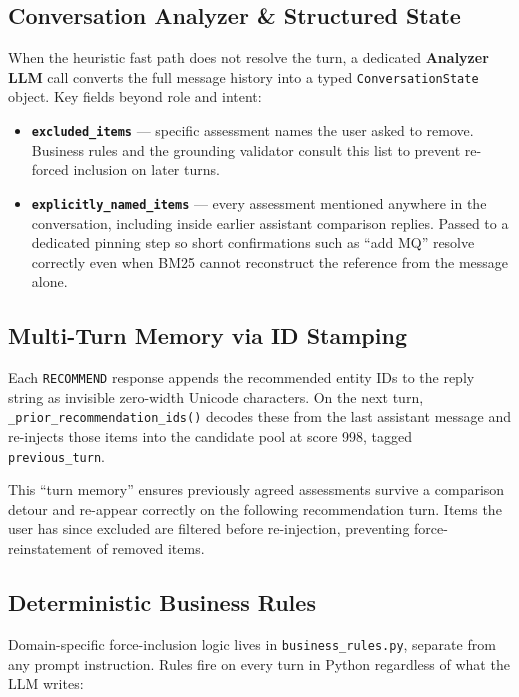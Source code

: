 \documentclass[10pt,twocolumn,letterpaper]{article}
\begin{document}
\subsection{Conversation Analyzer \& Structured State}

When the heuristic fast path does not resolve the turn, a dedicated
\textbf{Analyzer LLM} call converts the full message history into a
typed \texttt{ConversationState} object. Key fields beyond role and
intent:

\begin{itemize}

\item \textbf{\texttt{excluded\_items}} --- specific assessment names the
user asked to remove. Business rules and the grounding validator
consult this list to prevent re-forced inclusion on later turns.

\item \textbf{\texttt{explicitly\_named\_items}} --- every assessment
mentioned anywhere in the conversation, including inside earlier
assistant comparison replies. Passed to a dedicated pinning step so
short confirmations such as ``add MQ'' resolve correctly even when BM25
cannot reconstruct the reference from the message alone.

\end{itemize}

\subsection{Multi-Turn Memory via ID Stamping}

Each \texttt{RECOMMEND} response appends the recommended entity IDs to
the reply string as invisible zero-width Unicode characters. On the
next turn, \texttt{\_prior\_recommendation\_ids()} decodes these from
the last assistant message and re-injects those items into the
candidate pool at score 998, tagged \texttt{previous\_turn}.

This ``turn memory'' ensures previously agreed assessments survive a
comparison detour and re-appear correctly on the following
recommendation turn. Items the user has since excluded are filtered
before re-injection, preventing force-reinstatement of removed items.

\subsection{Deterministic Business Rules}

Domain-specific force-inclusion logic lives in
\texttt{business\_rules.py}, separate from any prompt instruction.
Rules fire on every turn in Python regardless of what the LLM writes:
\end{document}
